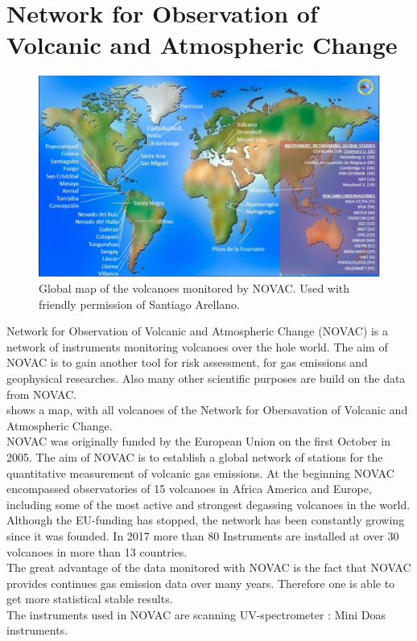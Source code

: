 \documentclass  [
  paper    = a4,
  BCOR     = 10mm,
  twoside,
  fontsize = 12pt,
  fleqn,
  toc      = bibnumbered,
  toc      = listofnumbered,
  numbers  = noendperiod,
  headings = normal,
  listof   = leveldown,
  version  = 3.03
]                                       {scrreprt}
\begin{document}
	\chapter{Network for Observation of Volcanic and Atmospheric Change \label{NOVAC}}
		\begin{figure}[h]
			\centering
			\includegraphics[width=0.8\linewidth]{Bilder/NOVAC2015}
			\caption{Global map of the volcanoes monitored by NOVAC. Used with friendly permission of Santiago Arellano.}
			\label{fig:novac2015}
		\end{figure}
		Network for Observation of Volcanic and Atmospheric Change (NOVAC) is a network of instruments monitoring volcanoes over the hole world. 
		The aim of NOVAC is to gain another tool for risk assessment, for gas emissions and geophysical researches. Also many other scientific purposes are build on the data from NOVAC.\\
		 shows a map, with all volcanoes of the Network for Obersavation of Volcanic and Atmospheric Change.\\
		NOVAC was originally funded by the European Union on the first October in 2005. The aim of NOVAC is to  establish  a  global  
		network  of  stations  for  the  quantitative  measurement  of  volcanic gas  emissions. At the beginning NOVAC encompassed observatories of 15 volcanoes in Africa America and Europe, including some of the most active and strongest degassing volcanoes in the world. Although the EU-funding has stopped, the network has been constantly growing since it was founded. In 2017 more than 80 Instruments are installed at over 30 volcanoes in more than 13 countries.\\
		The great advantage of the data monitored with NOVAC is the fact
		that NOVAC provides continues gas emission data over many years. Therefore one is able to get more statistical stable results.\\
		The instruments used in NOVAC are scanning UV-spectrometer : Mini Doas instruments. \\
\end{document}
